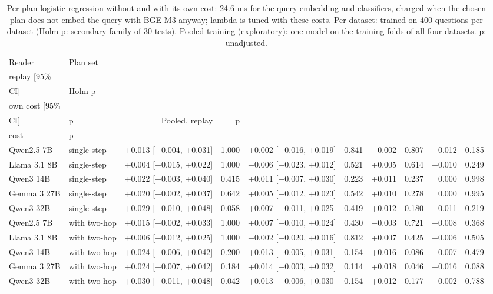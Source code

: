 \begin{table}[t]
\centering\footnotesize
\setlength{\tabcolsep}{2pt}
\caption{Per-plan logistic regression without and with its own cost: 24.6 ms for the query embedding and classifiers, charged when the chosen plan does not embed the query with BGE-M3 anyway; lambda is tuned with these costs. Per dataset: trained on 400 questions per dataset (Holm p: secondary family of 30 tests). Pooled training (exploratory): one model on the training folds of all four datasets. p: unadjusted.}
\label{tab:review_overhead}
\begin{tabular*}{\linewidth}{@{\extracolsep{\fill}}llrrrrrrrr}
\toprule
Reader & Plan set & \begin{tabular}[b]{@{}r@{}}Per dataset, \\ replay [95\% \\ CI]\end{tabular} & Holm p & \begin{tabular}[b]{@{}r@{}}Per dataset, \\ own cost [95\% \\ CI]\end{tabular} & p & Pooled, replay & p  & \begin{tabular}[b]{@{}r@{}}Pooled, own \\ cost\end{tabular} & p   \\
\midrule
Qwen2.5 7B & single-step & +0.013 [$-$0.004, +0.031] & 1.000 & +0.002 [$-$0.016, +0.019] & 0.841 & $-$0.002 & 0.807 & $-$0.012 & 0.185 \\
Llama 3.1 8B & single-step & +0.004 [$-$0.015, +0.022] & 1.000 & $-$0.006 [$-$0.023, +0.012] & 0.521 & +0.005 & 0.614 & $-$0.010 & 0.249 \\
Qwen3 14B & single-step & +0.022 [+0.003, +0.040] & 0.415 & +0.011 [$-$0.007, +0.030] & 0.223 & +0.011 & 0.237 & 0.000 & 0.998 \\
Gemma 3 27B & single-step & +0.020 [+0.002, +0.037] & 0.642 & +0.005 [$-$0.012, +0.023] & 0.542 & +0.010 & 0.278 & 0.000 & 0.995 \\
Qwen3 32B & single-step & +0.029 [+0.010, +0.048] & 0.058 & +0.007 [$-$0.011, +0.025] & 0.419 & +0.012 & 0.180 & $-$0.011 & 0.219 \\
Qwen2.5 7B & with two-hop & +0.015 [$-$0.002, +0.033] & 1.000 & +0.007 [$-$0.010, +0.024] & 0.430 & $-$0.003 & 0.721 & $-$0.008 & 0.368 \\
Llama 3.1 8B & with two-hop & +0.006 [$-$0.012, +0.025] & 1.000 & $-$0.002 [$-$0.020, +0.016] & 0.812 & +0.007 & 0.425 & $-$0.006 & 0.505 \\
Qwen3 14B & with two-hop & +0.024 [+0.006, +0.042] & 0.200 & +0.013 [$-$0.005, +0.031] & 0.154 & +0.016 & 0.086 & +0.007 & 0.479 \\
Gemma 3 27B & with two-hop & +0.024 [+0.007, +0.042] & 0.184 & +0.014 [$-$0.003, +0.032] & 0.114 & +0.018 & 0.046 & +0.016 & 0.088 \\
Qwen3 32B & with two-hop & +0.030 [+0.011, +0.048] & 0.042 & +0.013 [$-$0.006, +0.030] & 0.154 & +0.012 & 0.177 & $-$0.002 & 0.788 \\
\bottomrule
\end{tabular*}
\end{table}
